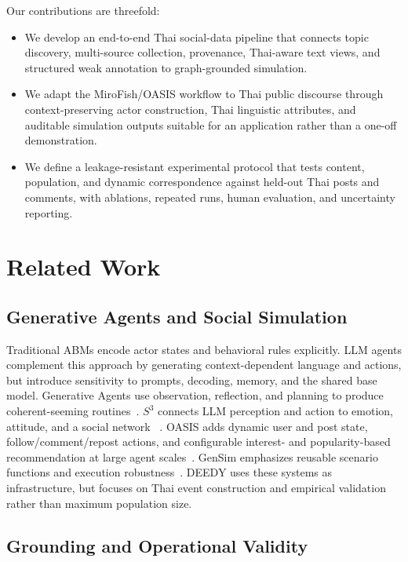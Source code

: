 \documentclass[conference]{IEEEtran}
\begin{document}
Our contributions are threefold:
\begin{itemize}
    \item We develop an end-to-end Thai social-data pipeline that connects
    topic discovery, multi-source collection, provenance, Thai-aware text
    views, and structured weak annotation to graph-grounded simulation.
    \item We adapt the MiroFish/OASIS workflow to Thai public discourse through
    context-preserving actor construction, Thai linguistic attributes, and
    auditable simulation outputs suitable for an application rather than a
    one-off demonstration.
    \item We define a leakage-resistant experimental protocol that tests
    content, population, and dynamic correspondence against held-out Thai posts
    and comments, with ablations, repeated runs, human evaluation, and
    uncertainty reporting.
\end{itemize}

\section{Related Work}

\subsection{Generative Agents and Social Simulation}

Traditional ABMs encode actor states and behavioral rules explicitly. LLM
agents complement this approach by generating context-dependent language and
actions, but introduce sensitivity to prompts, decoding, memory, and the shared
base model. Generative Agents use observation, reflection, and planning to
produce coherent-seeming routines~\cite{park2023generative}. $S^3$ connects LLM
perception and action to emotion, attitude, and a social network
~\cite{gao2023s3}. OASIS adds dynamic user and post state, follow/comment/repost
actions, and configurable interest- and popularity-based recommendation at
large agent scales~\cite{yang2024oasis}. GenSim emphasizes reusable scenario
functions and execution robustness~\cite{tang2025gensim}. DEEDY uses these
systems as infrastructure, but focuses on Thai event construction and
empirical validation rather than maximum population size.

\subsection{Grounding and Operational Validity}
\end{document}
